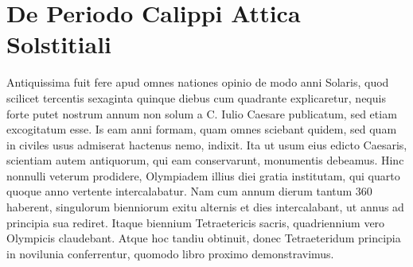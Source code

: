 \section{De Periodo Calippi Attica Solstitiali}
Antiquissima fuit fere apud omnes nationes opinio de modo
anni Solaris, quod scilicet tercentis sexaginta quinque diebus
cum quadrante explicaretur, nequis forte putet nostrum annum
non solum a C. %
 Iulio Caesare publicatum, sed etiam excogitatum esse.
Is eam anni formam, quam omnes sciebant quidem, sed quam in civiles
usus admiserat hactenus nemo, indixit.
Ita ut usum eius edicto Caesaris,
scientiam autem antiquorum, qui eam conservarunt, monumentis
debeamus.
Hinc nonnulli veterum prodidere, Olympiadem illius
diei gratia institutam, qui quarto quoque anno vertente intercalabatur.
Nam cum annum dierum tantum 360 haberent, singulorum bienniorum
exitu alternis  et  dies intercalabant, ut annus ad principia
sua rediret.
Itaque biennium Tetraetericis sacris, quadriennium vero
Olympicis claudebant.
Atque hoc tandiu obtinuit, donec Tetraeteridum
principia in novilunia conferrentur, quomodo libro proximo
demonstravimus.

